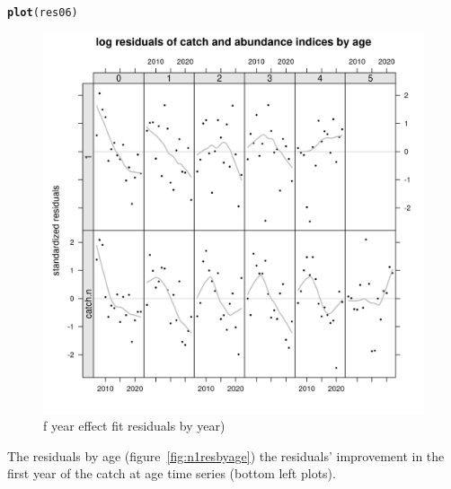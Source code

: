 \documentclass[a4paper,english,11pt]{article}\usepackage[]{graphicx}\usepackage[]{xcolor}
\makeatletter
\newcommand{\hldef}[1]{\textcolor[rgb]{0.345,0.345,0.345}{#1}}%
\newcommand{\hlkwd}[1]{\textcolor[rgb]{0.737,0.353,0.396}{\textbf{#1}}}%
\newenvironment{kframe}{%
 \def\at@end@of@kframe{}%
 \ifinner\ifhmode%
  \def\at@end@of@kframe{\end{minipage}}%
  \begin{minipage}{\columnwidth}%
 \fi\fi%
 \def\FrameCommand##1{\hskip\@totalleftmargin \hskip-\fboxsep
 \colorbox{shadecolor}{##1}\hskip-\fboxsep
     \hskip-\linewidth \hskip-\@totalleftmargin \hskip\columnwidth}%
 \MakeFramed {\advance\hsize-\width
   \@totalleftmargin\z@ \linewidth\hsize
   \@setminipage}}%
 {\par\unskip\endMakeFramed%
 \at@end@of@kframe}
\newenvironment{knitrout}{}{} %
\makeatother
\begin{document}
\begin{knitrout}
\color{fgcolor}\begin{kframe}
\begin{alltt}
\hlkwd{plot}\hldef{(res06)}
\end{alltt}
\end{kframe}\begin{figure}[H]

{\centering \includegraphics[width=.9\linewidth]{figure/n1arresbyyear-1} 

}

\caption[f year effect fit residuals by year)]{f year effect fit residuals by year)}\label{fig:n1arresbyyear}
\end{figure}

\end{knitrout}

The residuals by age (figure~\ref{fig:n1resbyage}) the residuals' improvement in the first year of the catch at age time series (bottom left plots).  
\end{document}
